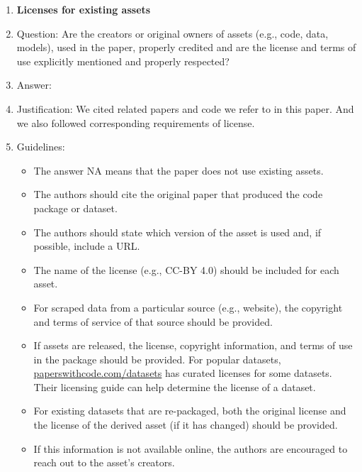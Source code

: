 \documentclass{article}
\begin{document}
\begin{enumerate}
\item {\bf Licenses for existing assets}
    \item[] Question: Are the creators or original owners of assets (e.g., code, data, models), used in the paper, properly credited and are the license and terms of use explicitly mentioned and properly respected?
    \item[] Answer: \answerYes{} %
    \item[] Justification: We cited related papers and code we refer to in this paper. And we also followed corresponding requirements of license.
    \item[] Guidelines:
    \begin{itemize}
        \item The answer NA means that the paper does not use existing assets.
        \item The authors should cite the original paper that produced the code package or dataset.
        \item The authors should state which version of the asset is used and, if possible, include a URL.
        \item The name of the license (e.g., CC-BY 4.0) should be included for each asset.
        \item For scraped data from a particular source (e.g., website), the copyright and terms of service of that source should be provided.
        \item If assets are released, the license, copyright information, and terms of use in the package should be provided. For popular datasets, \url{paperswithcode.com/datasets} has curated licenses for some datasets. Their licensing guide can help determine the license of a dataset.
        \item For existing datasets that are re-packaged, both the original license and the license of the derived asset (if it has changed) should be provided.
        \item If this information is not available online, the authors are encouraged to reach out to the asset's creators.
    \end{itemize}


\end{enumerate}
\end{document}
